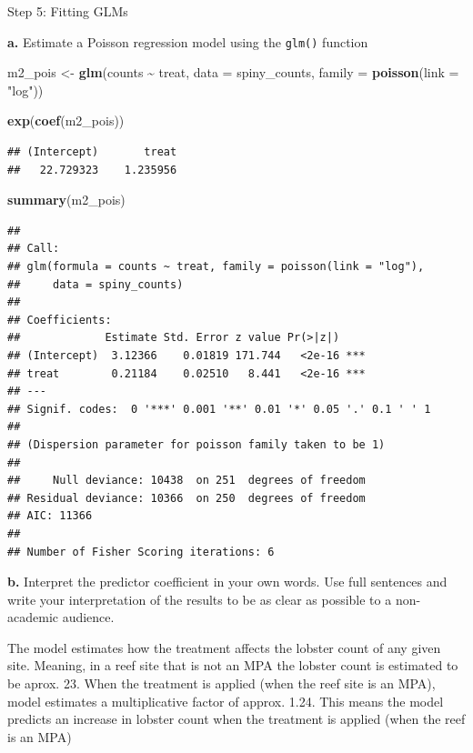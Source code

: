 \documentclass[
]{article}
\newenvironment{Shaded}{\begin{snugshade}}{\end{snugshade}}
\newcommand{\AttributeTok}[1]{\textcolor[rgb]{0.13,0.29,0.53}{#1}}
\newcommand{\FunctionTok}[1]{\textcolor[rgb]{0.13,0.29,0.53}{\textbf{#1}}}
\newcommand{\NormalTok}[1]{#1}
\newcommand{\OtherTok}[1]{\textcolor[rgb]{0.56,0.35,0.01}{#1}}
\newcommand{\SpecialCharTok}[1]{\textcolor[rgb]{0.81,0.36,0.00}{\textbf{#1}}}
\newcommand{\StringTok}[1]{\textcolor[rgb]{0.31,0.60,0.02}{#1}}
\begin{document}
Step 5: Fitting GLMs

\textbf{a.} Estimate a Poisson regression model using the \texttt{glm()}
function

\begin{Shaded}
\begin{Highlighting}[]
\NormalTok{m2\_pois }\OtherTok{\textless{}{-}} \FunctionTok{glm}\NormalTok{(counts }\SpecialCharTok{\textasciitilde{}}\NormalTok{ treat, }
                   \AttributeTok{data =}\NormalTok{ spiny\_counts,}
                   \AttributeTok{family =} \FunctionTok{poisson}\NormalTok{(}\AttributeTok{link =} \StringTok{"log"}\NormalTok{)) }

\FunctionTok{exp}\NormalTok{(}\FunctionTok{coef}\NormalTok{(m2\_pois))}
\end{Highlighting}
\end{Shaded}

\begin{verbatim}
## (Intercept)       treat 
##   22.729323    1.235956
\end{verbatim}

\begin{Shaded}
\begin{Highlighting}[]
\FunctionTok{summary}\NormalTok{(m2\_pois)}
\end{Highlighting}
\end{Shaded}

\begin{verbatim}
## 
## Call:
## glm(formula = counts ~ treat, family = poisson(link = "log"), 
##     data = spiny_counts)
## 
## Coefficients:
##             Estimate Std. Error z value Pr(>|z|)    
## (Intercept)  3.12366    0.01819 171.744   <2e-16 ***
## treat        0.21184    0.02510   8.441   <2e-16 ***
## ---
## Signif. codes:  0 '***' 0.001 '**' 0.01 '*' 0.05 '.' 0.1 ' ' 1
## 
## (Dispersion parameter for poisson family taken to be 1)
## 
##     Null deviance: 10438  on 251  degrees of freedom
## Residual deviance: 10366  on 250  degrees of freedom
## AIC: 11366
## 
## Number of Fisher Scoring iterations: 6
\end{verbatim}

\textbf{b.} Interpret the predictor coefficient in your own words. Use
full sentences and write your interpretation of the results to be as
clear as possible to a non-academic audience.

The model estimates how the treatment affects the lobster count of any
given site. Meaning, in a reef site that is not an MPA the lobster count
is estimated to be aprox. 23. When the treatment is applied (when the
reef site is an MPA), model estimates a multiplicative factor of approx.
1.24. This means the model predicts an increase in lobster count when
the treatment is applied (when the reef is an MPA)
\end{document}
